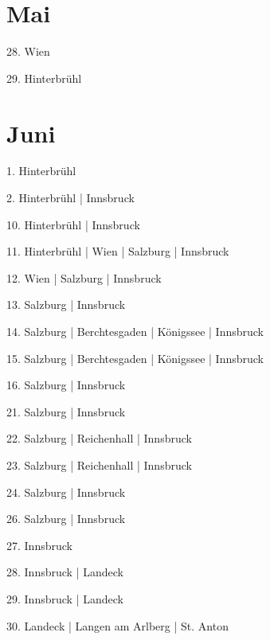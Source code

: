 \documentclass[twoside=false,titlepage=false,open=any, parskip=never, fontsize=10pt, headings=small, chapterprefix=false, appendixprefix=false, DIV=15]{scrbook}
\begin{document}
\begin{multicols}{3}
            \section*{Mai}
            28. Wien\par
            29. Hinterbrühl\par
            \section*{Juni}
            1. Hinterbrühl\par
            2. Hinterbrühl | Innsbruck\par
            10. Hinterbrühl | Innsbruck\par
            11. Hinterbrühl | Wien | Salzburg | Innsbruck\par
            12. Wien | Salzburg | Innsbruck\par
            13. Salzburg | Innsbruck\par
            14. Salzburg | Berchtesgaden | Königssee | Innsbruck\par
            15. Salzburg | Berchtesgaden | Königssee | Innsbruck\par
            16. Salzburg | Innsbruck\par
            21. Salzburg | Innsbruck\par
            22. Salzburg | Reichenhall | Innsbruck\par
            23. Salzburg | Reichenhall | Innsbruck\par
            24. Salzburg | Innsbruck\par
            26. Salzburg | Innsbruck\par
            27. Innsbruck\par
            28. Innsbruck | Landeck\par
            29. Innsbruck | Landeck\par
            30. Landeck | Langen am Arlberg | St. Anton\par

\end{multicols}
\end{document}
